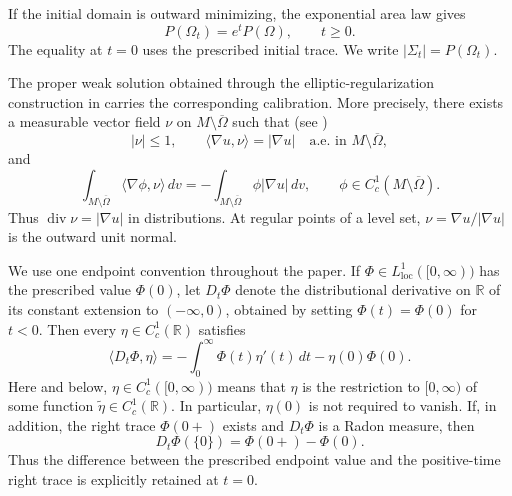 \documentclass[10pt,a4paper]{amsart}
\numberwithin{equation}{section}
\newcommand{\diver}{\operatorname{div}}
\begin{document}
If the initial domain is outward minimizing, the exponential area law \cite[Lemma~1.6]{HI2001} gives
\begin{equation}\label{eq:area-growth}
    P(\Omega_t)=e^tP(\Omega),
    \qquad t\geq0.
\end{equation}
The equality at $t=0$ uses the prescribed initial trace.  We write $|\Sigma_t|=P(\Omega_t)$.

The proper weak solution obtained through the elliptic-regularization construction in \cite[Theorem 3.1]{HI2001} carries the corresponding calibration. More precisely, there exists a measurable vector field $\nu$ on $M\setminus\overline\Omega$ such that (see \cite[(3.15)]{HI2001})
\begin{equation}\label{eq:calibration}
    |\nu|\leq1,
    \qquad
    \langle\nabla u,\nu\rangle=|\nabla u|
    \quad\text{a.e. in }M\setminus\overline\Omega,
\end{equation}
and
\begin{equation}\label{eq:calibration-div}
    \int_{M\setminus\overline\Omega}\langle\nabla\phi,\nu\rangle\,dv
    =-\int_{M\setminus\overline\Omega}\phi|\nabla u|\,dv,
    \qquad
    \phi\in C_c^1(M\setminus\overline\Omega).
\end{equation}
Thus $\diver\nu=|\nabla u|$ in distributions.  At regular points of a level set, $\nu=\nabla u/|\nabla u|$ is the outward unit normal.

We use one endpoint convention throughout the paper.  If $\Phi\in L^1_{\mathrm{loc}}([0,\infty))$ has the prescribed value $\Phi(0)$, let $D_t\Phi$ denote the distributional derivative on $\mathbb R$ of its constant extension to $(-\infty,0)$, obtained by setting $\Phi(t)=\Phi(0)$ for $t<0$.  Then every $\eta\in C_c^1(\mathbb R)$ satisfies
\begin{equation}\label{eq:endpoint-derivative-convention}
    \langle D_t\Phi,\eta\rangle
    =-\int_0^\infty\Phi(t)\eta'(t)\,dt-\eta(0)\Phi(0).
\end{equation}
Here and below, $\eta\in C_c^1([0,\infty))$ means that $\eta$ is the restriction to $[0,\infty)$ of some function $\widetilde{\eta}\in C_c^1(\mathbb R)$. In particular, $\eta(0)$ is not required to vanish. If, in addition, the right trace $\Phi(0+)$ exists and $D_t\Phi$ is a Radon measure, then
\begin{equation*}
    D_t\Phi(\{0\})=\Phi(0+)-\Phi(0).
\end{equation*}
Thus the difference between the prescribed endpoint value and the positive-time right trace is explicitly retained at $t=0$.
\end{document}
